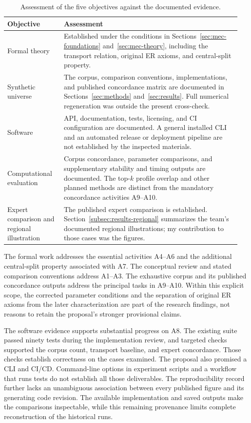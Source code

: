\documentclass{article}
\theoremstyle{plain}
\theoremstyle{remark}
\begin{document}
\begin{table}[htbp]
\centering
\caption{Assessment of the five objectives against the documented evidence.}
\label{tab:discussion-objectives}
\small
\begin{tabular}{@{}p{0.23\linewidth}p{0.72\linewidth}@{}}
\toprule
Objective & Assessment\\
\midrule
Formal theory & Established under the conditions in Sections~\ref{sec:mec-foundations} and~\ref{sec:mec-theory}, including the transport relation, original ER axioms, and central-split property.\\[4pt]
Synthetic universe & The corpus, comparison conventions, implementations, and published concordance matrix are documented in Sections~\ref{sec:methods} and~\ref{sec:results}. Full numerical regeneration was outside the present cross-check.\\[4pt]
Software & API, documentation, tests, licensing, and CI configuration are documented. A general installed CLI and an automated release or deployment pipeline are not established by the inspected materials.\\[4pt]
Computational evaluation & Corpus concordance, parameter comparisons, and supplementary stability and timing outputs are documented. The top-$k$ profile overlap and other planned methods are distinct from the mandatory concordance activities A9--A10.\\[4pt]
Expert comparison and regional illustration & The published expert comparison is established. Section~\ref{subsec:results-regional} summarizes the team's documented regional illustrations; my contribution to those cases was the figures.\\
\bottomrule
\end{tabular}
\end{table}

The formal work addresses the essential activities A4--A6 and the additional central-split property associated with A7. The conceptual review and stated comparison conventions address A1--A3. The exhaustive corpus and its published concordance outputs address the principal tasks in A9--A10. Within this explicit scope, the corrected parameter conditions and the separation of original ER axioms from the later characterization are part of the research findings, not reasons to retain the proposal's stronger provisional claims.

The software evidence supports substantial progress on A8. The existing suite passed ninety tests during the implementation review, and targeted checks supported the corpus count, transport baseline, and expert concordance. Those checks establish correctness on the cases examined. The proposal also promised a CLI and CI/CD. Command-line options in experiment scripts and a workflow that runs tests do not establish all those deliverables. The reproducibility record further lacks an unambiguous association between every published figure and its generating code revision. The available implementation and saved outputs make the comparisons inspectable, while this remaining provenance limits complete reconstruction of the historical runs.
\end{document}
